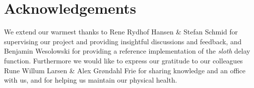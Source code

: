 \section{Acknowledgements}
We extend our warmest thanks to Rene Rydhof Hansen \& Stefan Schmid for supervising our project and providing insightful discussions and feedback, and Benjamin Wesolowski for providing a reference implementation of the \emph{sloth} delay function.
Furthermore we would like to express our gratitude to our colleagues Rune Willum Larsen \& Alex Grøndahl Frie for sharing knowledge and an office with us, and for helping us maintain our physical health.

